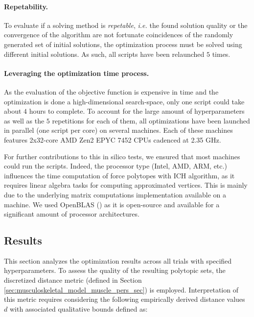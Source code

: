 \paragraph*{Repetability.} To evaluate if a solving method is \emph{repetable}, \emph{i.e.} the found solution quality or the convergence of the algorithm are not fortunate coincidences of the randomly generated set of initial solutions, the optimization process must be solved using different initial solutions. As such, all scripts have been relaunched $5$ times. 

\paragraph*{Leveraging the optimization time process.}
As the evaluation of the objective function is expensive in time and the optimization is done a high-dimensional search-space, only one script could take about $4$ hours to complete. To account for the large amount of hyperparameters as well as the $5$ repetitions for each of them, all optimizations have been launched in parallel (one script per core) on several machines. Each of these machines features 2x32-core AMD Zen2 EPYC 7452 CPUs cadenced at 2.35 GHz.

For further contributions to this in silico tests, we ensured that most machines could run the scripts. Indeed, the processor type (Intel, AMD, ARM, etc.) influences the time computation of force polytopes with ICH algorithm, as it requires linear algebra tasks for computing approximated vertices. This is mainly due to the underlying matrix computations implementation available on a machine. We used OpenBLAS (\cite{wangAUGEMAutomaticallyGenerate2013}) as it is open-source and available for a significant amount of processor architectures.


\subsection{Results}
This section analyzes the optimization results across all trials with specified hyperparameters. To assess the quality of the resulting polytopic sets, the discretized distance metric (defined in Section \ref{sec:musculoskeletal_model_muscle_pers_sec}) is employed. Interpretation of this metric requires considering the following empirically derived distance values $d$ with associated qualitative bounds defined as:

